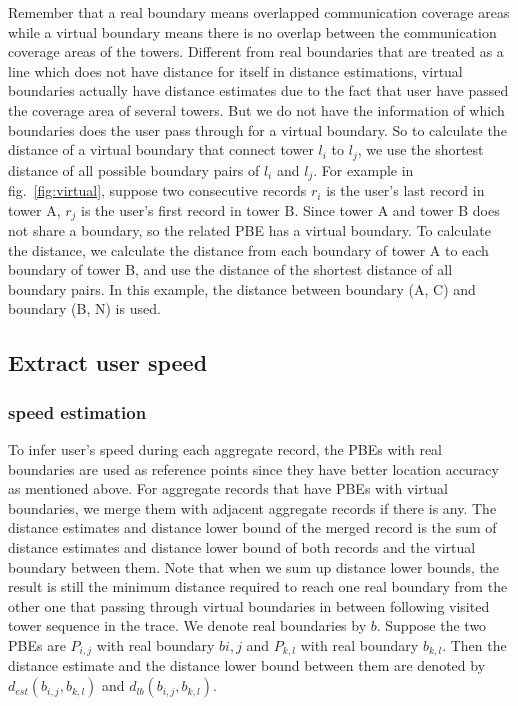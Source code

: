 Remember that a real boundary means overlapped communication coverage areas while a virtual boundary means there is no overlap between the communication coverage areas of the towers. Different from real boundaries that are treated as a line which does not have distance for itself in distance estimations, virtual boundaries actually have distance estimates due to the fact that user have passed the coverage area of several towers. But we do not have the information of which boundaries does the user pass through for a virtual boundary. So to calculate the distance of a virtual boundary that connect tower $l_i$ to $l_j$, we use the shortest distance of all possible boundary pairs of $l_i$ and $l_j$. For example in fig.~\ref{fig:virtual}, suppose two consecutive records $r_i$ is the user's last record in tower A, $r_j$ is the user's first record in tower B. Since tower A and tower B does not share a boundary, so the related PBE has a virtual boundary. To calculate the distance, we calculate the distance from each boundary of tower A to each boundary of tower B, and use the distance of the shortest distance of all boundary pairs. In this example, the distance between boundary (A, C) and boundary (B, N) is used.

\subsection{Extract user speed}

\subsubsection{speed estimation}

To infer user's speed during each aggregate record, the PBEs with real boundaries are used as reference points since they have better location accuracy as mentioned above. For aggregate records that have PBEs with virtual boundaries, we merge them with adjacent aggregate records if there is any. The distance estimates and distance lower bound of the merged record is the sum of distance estimates and distance lower bound of both records and the virtual boundary between them. Note that when we sum up distance lower bounds, the result is still the minimum distance required to reach one real boundary from the other one that passing through virtual boundaries in between following visited tower sequence in the trace. We denote real boundaries by $b$. Suppose the two PBEs are $P_{i,j}$ with real boundary $b{i,j}$ and $P_{k,l}$ with real boundary $b_{k,l}$. Then the distance estimate and the distance lower bound between them are denoted by $d_{est}(b_{i,j}, b_{k,l})$ and $d_{lb}(b_{i,j}, b_{k,l})$.

